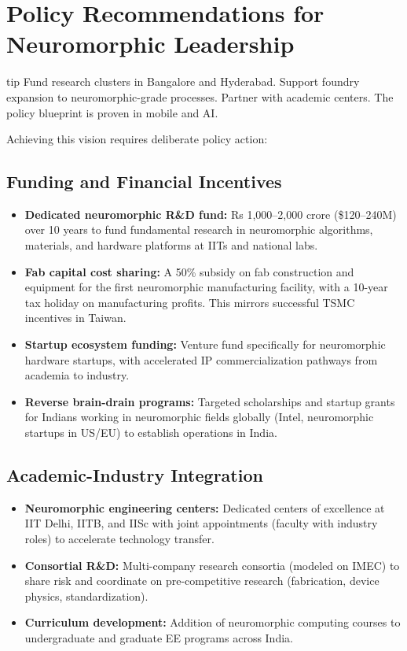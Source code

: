 \section{Policy Recommendations for Neuromorphic Leadership}
\begin{block}{tip}
Fund research clusters in Bangalore and Hyderabad. Support foundry expansion to neuromorphic-grade processes. Partner with academic centers. The policy blueprint is proven in mobile and AI.
\end{block}


Achieving this vision requires deliberate policy action:

\subsection{Funding and Financial Incentives}

\begin{itemize}
\item \textbf{Dedicated neuromorphic R\&D fund:} Rs 1,000--2,000 crore (\$120--240M) over 10 years to fund fundamental research in neuromorphic algorithms, materials, and hardware platforms at IITs and national labs.

\item \textbf{Fab capital cost sharing:} A 50\% subsidy on fab construction and equipment for the first neuromorphic manufacturing facility, with a 10-year tax holiday on manufacturing profits. This mirrors successful TSMC incentives in Taiwan.

\item \textbf{Startup ecosystem funding:} Venture fund specifically for neuromorphic hardware startups, with accelerated IP commercialization pathways from academia to industry.

\item \textbf{Reverse brain-drain programs:} Targeted scholarships and startup grants for Indians working in neuromorphic fields globally (Intel, neuromorphic startups in US/EU) to establish operations in India.
\end{itemize}

\subsection{Academic-Industry Integration}

\begin{itemize}
\item \textbf{Neuromorphic engineering centers:} Dedicated centers of excellence at IIT Delhi, IITB, and IISc with joint appointments (faculty with industry roles) to accelerate technology transfer.

\item \textbf{Consortial R\&D:} Multi-company research consortia (modeled on IMEC) to share risk and coordinate on pre-competitive research (fabrication, device physics, standardization).

\item \textbf{Curriculum development:} Addition of neuromorphic computing courses to undergraduate and graduate EE programs across India.
\end{itemize}

